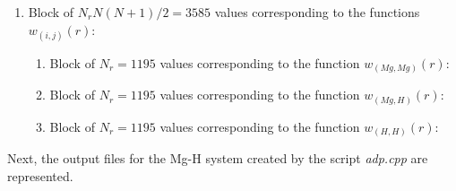 \documentclass{article}
\begin{document}
\begin{enumerate}
		
		\item  Block of $N_rN(N+1)/2=3585$ values corresponding to the functions $w_{(i,j)}(r)$:
		\begin{enumerate}
			\item Block of $N_r=1195$ values corresponding to the function $w_{(Mg,Mg)}(r)$:
			
			\item Block of $N_r=1195$ values corresponding to the function $w_{(Mg,H)}(r)$:
			
			\item Block of $N_r=1195$ values corresponding to the function $w_{(H,H)}(r)$:
		\end{enumerate}
	\end{enumerate}

Next, the output files for the Mg-H system created by the script \textit{adp.cpp} are represented.
\end{document}

